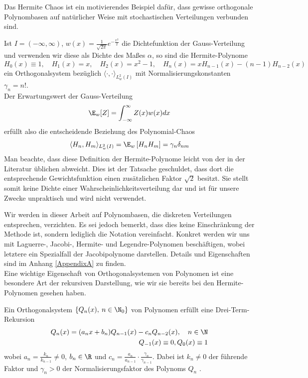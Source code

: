 Das Hermite Chaos ist ein motivierendes Beispiel dafür, dass gewisse orthogonale Polynombasen auf natürlicher Weise mit stochastischen Verteilungen verbunden sind.
\begin{mathbsp}
\label{bsp:hermitechaos}
Ist $I=(-\infty,\infty)$, $w(x)=\frac{1}{\sqrt{2\pi}}e^{-\frac{x^2}{2}}$ die Dichtefunktion der Gauss-Verteilung und verwenden wir diese als Dichte des Maßes $\alpha$, so sind die Hermite-Polynome
\[H_0(x)\equiv 1,\quad H_1(x)=x,\quad H_2(x)=x^2-1,\quad H_n(x)=xH_{n-1}(x)-(n-1)H_{n-2}(x)\]
ein Orthogonalsystem bezüglich $\langle\cdot,\cdot\rangle_{L_w^2(I)}$ mit Normalisierungskonstanten $\gamma_n=n!$.\\
Der Erwartungswert der Gauss-Verteilung
\[\E_w[Z]= \int_{-\infty}^\infty Z(x)w(x)dx\] erfüllt also die entscheidende Beziehung des Polynomial-Chaos
\[\langle H_n,H_m\rangle_{L_w^2(I)} =\E_w \left[H_nH_m\right]=\gamma_n\delta_{nm}\]
Man beachte, dass diese Definition der Hermite-Polynome leicht von der in der Literatur üblichen abweicht. Dies ist der Tatsache geschuldet, dass dort die entsprechende Gewichtsfunktion einen zusätzlichen Faktor $\sqrt{2}$ besitzt. Sie stellt somit keine Dichte einer Wahrscheinlichkeitsverteilung dar und ist für unsere Zwecke unpraktisch und wird nicht verwendet. 
\end{mathbsp}
Wir werden in dieser Arbeit auf Polynombasen, die diskreten Verteilungen entsprechen, verzichten. Es sei jedoch bemerkt, dass dies keine Einschränkung der Methode ist, sondern lediglich die Notation vereinfacht. Konkret werden wir uns mit Laguerre-, Jacobi-, Hermite- und Legendre-Polynomen beschäftigen, wobei letztere ein Spezialfall der Jacobipolynome darstellen. Details und Eigenschaften sind im Anhang \ref{AppendixA} zu finden.\\[0.3cm]
Eine wichtige Eigenschaft von Orthogonalsystemen von Polynomen ist eine besondere Art der rekursiven Darstellung, wie wir sie bereits bei den Hermite-Polynomen gesehen haben.
\begin{maththeorem}
\label{threetermexist}
Ein Orthogonalsystem $\left\lbrace Q_n(x),\: n\in\N_0\right\rbrace$ von Polynomen erfüllt eine Drei-Term-Rekursion
\begin{eqnarray}
Q_n(x)=(a_nx+b_n)Q_{n-1}(x)-c_nQ_{n-2}(x),\quad n\in\N\\
Q_{-1}(x)\equiv 0, Q_0(x)\equiv 1\nonumber
\end{eqnarray}
wobei $a_n=\frac{k_n}{k_{n-1}}\neq 0$, $b_n\in\R$ und $c_n=\frac{a_n}{a_{n-1}}\cdot \frac{\gamma_n}{\gamma_{n-1}}$.
Dabei ist $k_n\neq 0$ der führende Faktor und $\gamma_n>0$ der Normalisierungsfaktor des Polynoms $Q_n$ . 
\end{maththeorem}
